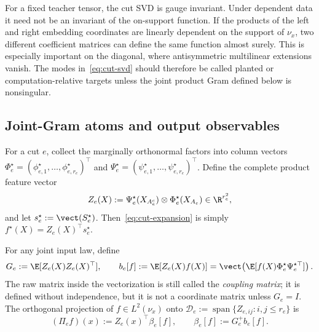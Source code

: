 \begin{remark}\label{rem:joint-identifiability}
For a fixed teacher tensor, the cut SVD is gauge invariant.  Under dependent data it need not be an
invariant of the on-support function.  If the products of the left and right embedding coordinates
are linearly dependent on the support of $\nu_x$, two different coefficient matrices can define the
same function almost surely.  This is especially important on the diagonal, where antisymmetric
multilinear extensions vanish.  The modes in~\eqref{eq:cut-svd} should therefore be called planted
or computation-relative targets unless the joint product Gram defined below is nonsingular.
\end{remark}

\subsection{Joint-Gram atoms and output observables}\label{sec:atoms}

For a cut $e$, collect the marginally orthonormal factors into column vectors
$\Phi_e^\star=(\phi_{e,1}^\star,\ldots,\phi_{e,r_e}^\star)^\top$ and
$\Psi_e^\star=(\psi_{e,1}^\star,\ldots,\psi_{e,r_e}^\star)^\top$.  Define the complete product
feature vector
\begin{equation}\label{eq:product-dictionary}
 Z_e(X):=\Psi_e^\star(X_{A_e^c})\otimes\Phi_e^\star(X_{A_e})\in\R^{r_e^2},
\end{equation}
and let $s_e^\star:=\vect(S_e^\star)$.  Then~\eqref{eq:cut-expansion} is simply
$f^\star(X)=Z_e(X)^\top s_e^\star$.

\begin{definition}\label{def:coupling}
For any joint input law, define
\begin{equation}\label{eq:joint-gram}
 G_e:=\E[Z_e(X)Z_e(X)^\top],
 \qquad
 b_e[f]:=\E[Z_e(X)f(X)]=\vect\!\left(\E[f(X)\Phi_e^\star\Psi_e^{\star\top}]\right).
\end{equation}
The raw matrix inside the vectorization is still called the \emph{coupling matrix}; it is defined
without independence, but it is not a coordinate matrix unless $G_e=I$.  The orthogonal projection
of $f\in L^2(\nu_x)$ onto
$\mathcal D_e:=\operatorname{span}\{Z_{e,ij}:i,j\le r_e\}$ is
\begin{equation}\label{eq:gram-projection}
 (\Pi_e f)(x):=Z_e(x)^\top\beta_e[f],
 \qquad
 \beta_e[f]:=G_e^+b_e[f].
\end{equation}
\end{definition}

